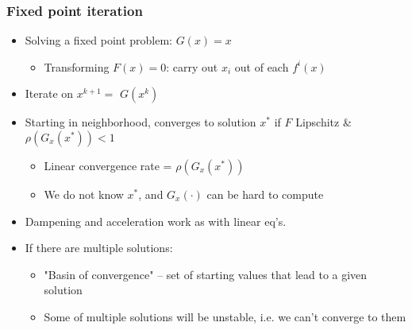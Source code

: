 \documentclass[bigger]{beamer}
\begin{document}
\begin{frame}%
\frametitle{Fixed point iteration}

\begin{itemize}
\item Solving a fixed point problem: $G(x)=x$

\begin{itemize}
\item Transforming $F(x)=0$: carry out $x_{i}$ out of each $f^{i}(x)$
\end{itemize}

\item Iterate on $x^{k+1}=$ $G(x^{k})$

\item Starting in neighborhood, converges to solution $x^{\ast }$ if $F$ Lipschitz \& $\rho (G_{x}(x^{\ast }))<1$

\begin{itemize}
\item Linear convergence rate = $\rho (G_{x}(x^{\ast }))$

\item We do not know $x^{\ast }$, and $G_{x}(\cdot )$ can be hard to compute
\end{itemize}

\item Dampening and acceleration work as with linear eq's.

\item If there are multiple solutions:

\begin{itemize}
\item "Basin of convergence" -- set of starting values that lead \newline
to a given solution

\item Some of multiple solutions will be unstable, \newline
i.e. we can't converge to them
\end{itemize}

\end{itemize}


\end{frame}%
\end{document}
